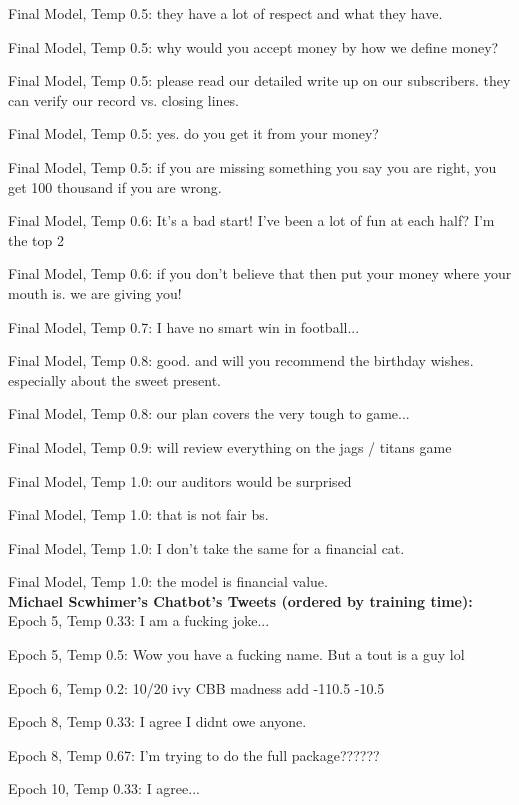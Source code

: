 \documentclass[5p,authoryear]{elsarticle}
\begin{document}
Final Model, Temp 0.5:
they have a lot of respect and what they have.

Final Model, Temp 0.5:
why would you accept money by how we define money?

Final Model, Temp 0.5:
please read our detailed write up on our subscribers. they can verify our record vs. closing lines. 

Final Model, Temp 0.5:
yes. do you get it from your money?

Final Model, Temp 0.5:
if you are missing something you say you are right, you get 100 thousand if you are wrong. 

Final Model, Temp 0.6:
It’s a bad start! I’ve been a lot of fun at each half? I'm the top 2

Final Model, Temp 0.6:
if you don’t believe that then put your money where your mouth is. we are giving you! 

Final Model, Temp 0.7:
I have no smart win in football...

Final Model, Temp 0.8:
good. and will you recommend the birthday wishes. especially about the sweet present. 

Final Model, Temp 0.8:
our plan covers the very tough to game... 

Final Model, Temp 0.9:
will review everything on the jags / titans game 

Final Model, Temp 1.0:
our auditors would be surprised

Final Model, Temp 1.0:
that is not fair bs.

Final Model, Temp 1.0:
I don’t take the same for a financial cat.

Final Model, Temp 1.0:
the model is financial value. \\




\textbf{Michael Scwhimer’s Chatbot’s Tweets (ordered by training time):}\\




Epoch 5, Temp 0.33:
I am a fucking joke... 

Epoch 5, Temp 0.5:
Wow you have a fucking name. But a tout is a guy lol 

Epoch 6, Temp 0.2:
10/20 ivy CBB madness add -110.5 -10.5 

Epoch 8, Temp 0.33:
I agree I didnt owe anyone. 

Epoch 8, Temp 0.67:
I'm trying to do the full package?????? 

Epoch 10, Temp 0.33:
I agree...
\end{document}

